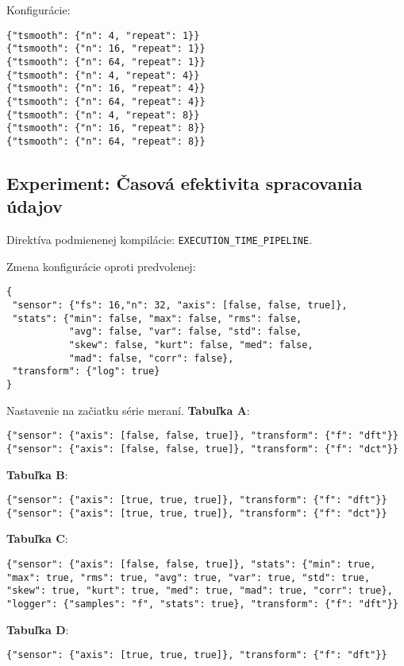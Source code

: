 \noindent Konfigurácie:
\begin{lstlisting}[style=experiments]
{"tsmooth": {"n": 4, "repeat": 1}}
{"tsmooth": {"n": 16, "repeat": 1}}
{"tsmooth": {"n": 64, "repeat": 1}}
{"tsmooth": {"n": 4, "repeat": 4}}
{"tsmooth": {"n": 16, "repeat": 4}}
{"tsmooth": {"n": 64, "repeat": 4}}
{"tsmooth": {"n": 4, "repeat": 8}}
{"tsmooth": {"n": 16, "repeat": 8}}
{"tsmooth": {"n": 64, "repeat": 8}}
\end{lstlisting}


\subsection*{Experiment: Časová efektivita spracovania údajov}
\noindent Direktíva podmienenej kompilácie: \verb|EXECUTION_TIME_PIPELINE|.

\noindent Zmena konfigurácie oproti predvolenej:
\begin{lstlisting}[style=messages]
{
 "sensor": {"fs": 16,"n": 32, "axis": [false, false, true]}, 
 "stats": {"min": false, "max": false, "rms": false, 
 		   "avg": false, "var": false, "std": false, 
 		   "skew": false, "kurt": false, "med": false, 
 		   "mad": false, "corr": false},
 "transform": {"log": true}
}
\end{lstlisting}

\noindent Nastavenie na začiatku série meraní. \textbf{Tabuľka A}:
\begin{lstlisting}[style=experiments]
{"sensor": {"axis": [false, false, true]}, "transform": {"f": "dft"}}
{"sensor": {"axis": [false, false, true]}, "transform": {"f": "dct"}}
\end{lstlisting}

\textbf{Tabuľka B}:
\begin{lstlisting}[style=experiments]
{"sensor": {"axis": [true, true, true]}, "transform": {"f": "dft"}}
{"sensor": {"axis": [true, true, true]}, "transform": {"f": "dct"}}
\end{lstlisting}

\textbf{Tabuľka C}:
\begin{lstlisting}[style=experiments]
{"sensor": {"axis": [false, false, true]}, "stats": {"min": true, "max": true, "rms": true, "avg": true, "var": true, "std": true, "skew": true, "kurt": true, "med": true, "mad": true, "corr": true},  "logger": {"samples": "f", "stats": true}, "transform": {"f": "dft"}}
\end{lstlisting}

\textbf{Tabuľka D}:
\begin{lstlisting}[style=experiments]
{"sensor": {"axis": [true, true, true]}, "transform": {"f": "dft"}}
\end{lstlisting}

